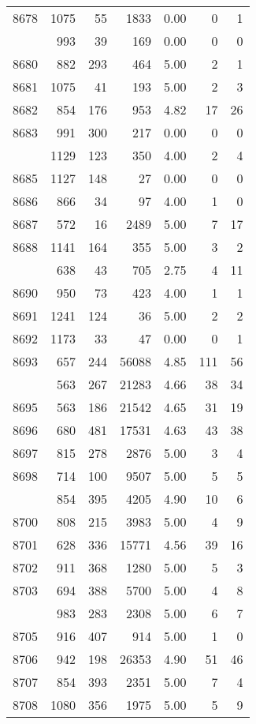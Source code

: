 \documentclass[
]{article}
\begin{document}
\begin{table}
\begin{tabular}[t]{lrrrrrr}
8678 & 1075 & 55 & 1833 & 0.00 & 0 & 1\\
\addlinespace
8679 & 993 & 39 & 169 & 0.00 & 0 & 0\\
8680 & 882 & 293 & 464 & 5.00 & 2 & 1\\
8681 & 1075 & 41 & 193 & 5.00 & 2 & 3\\
8682 & 854 & 176 & 953 & 4.82 & 17 & 26\\
8683 & 991 & 300 & 217 & 0.00 & 0 & 0\\
\addlinespace
8684 & 1129 & 123 & 350 & 4.00 & 2 & 4\\
8685 & 1127 & 148 & 27 & 0.00 & 0 & 0\\
8686 & 866 & 34 & 97 & 4.00 & 1 & 0\\
8687 & 572 & 16 & 2489 & 5.00 & 7 & 17\\
8688 & 1141 & 164 & 355 & 5.00 & 3 & 2\\
\addlinespace
8689 & 638 & 43 & 705 & 2.75 & 4 & 11\\
8690 & 950 & 73 & 423 & 4.00 & 1 & 1\\
8691 & 1241 & 124 & 36 & 5.00 & 2 & 2\\
8692 & 1173 & 33 & 47 & 0.00 & 0 & 1\\
8693 & 657 & 244 & 56088 & 4.85 & 111 & 56\\
\addlinespace
8694 & 563 & 267 & 21283 & 4.66 & 38 & 34\\
8695 & 563 & 186 & 21542 & 4.65 & 31 & 19\\
8696 & 680 & 481 & 17531 & 4.63 & 43 & 38\\
8697 & 815 & 278 & 2876 & 5.00 & 3 & 4\\
8698 & 714 & 100 & 9507 & 5.00 & 5 & 5\\
\addlinespace
8699 & 854 & 395 & 4205 & 4.90 & 10 & 6\\
8700 & 808 & 215 & 3983 & 5.00 & 4 & 9\\
8701 & 628 & 336 & 15771 & 4.56 & 39 & 16\\
8702 & 911 & 368 & 1280 & 5.00 & 5 & 3\\
8703 & 694 & 388 & 5700 & 5.00 & 4 & 8\\
\addlinespace
8704 & 983 & 283 & 2308 & 5.00 & 6 & 7\\
8705 & 916 & 407 & 914 & 5.00 & 1 & 0\\
8706 & 942 & 198 & 26353 & 4.90 & 51 & 46\\
8707 & 854 & 393 & 2351 & 5.00 & 7 & 4\\
8708 & 1080 & 356 & 1975 & 5.00 & 5 & 9\\

\end{tabular}
\end{table}
\end{document}
